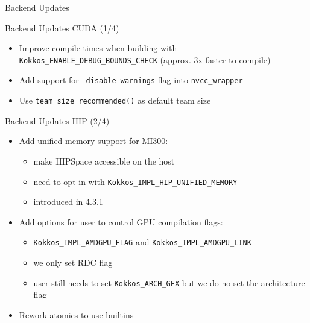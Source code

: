 

\begin{frame}[fragile]

  {\Huge Backend Updates}

  \vspace{10pt}

\end{frame}


\begin{frame}[fragile]{Backend Updates CUDA (1/4)}
  \begin{itemize}
	  \item Improve compile-times when building with \texttt{Kokkos\_ENABLE\_DEBUG\_BOUNDS\_CHECK} (approx. 3x faster to compile)
    \item Add support for \texttt{--disable-warnings} flag into \texttt{nvcc\_wrapper}
    \item Use \texttt{team\_size\_recommended()} as default team size 
  \end{itemize}
\end{frame}

\begin{frame}[fragile]{Backend Updates HIP (2/4)}
  \begin{itemize}
    \item Add unified memory support for MI300:
      \begin{itemize}
        \item make HIPSpace accessible on the host
        \item need to opt-in with \texttt{Kokkos\_IMPL\_HIP\_UNIFIED\_MEMORY}
        \item introduced in 4.3.1
      \end{itemize}
    \item Add options for user to control GPU compilation flags:
      \begin{itemize}
        \item \texttt{Kokkos\_IMPL\_AMDGPU\_FLAG} and \texttt{Kokkos\_IMPL\_AMDGPU\_LINK}
        \item we only set RDC flag
        \item user still needs to set \texttt{Kokkos\_ARCH\_GFX} but we do no set the
          architecture flag
      \end{itemize}
    \item Rework atomics to use builtins
  \end{itemize}
\end{frame}

